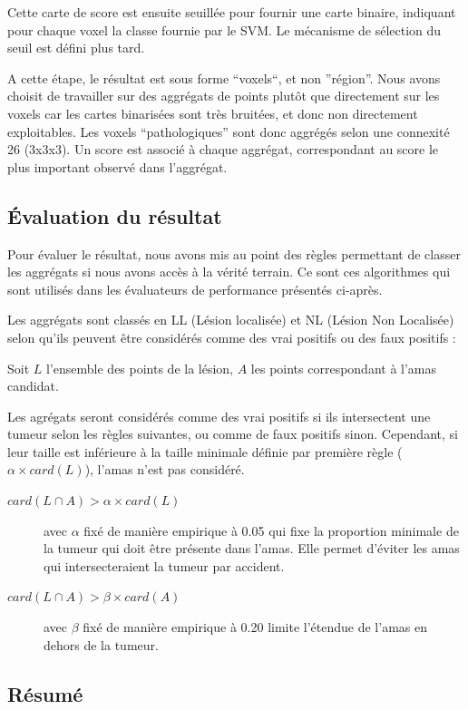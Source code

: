 Cette carte de score est ensuite seuillée pour fournir une carte binaire, indiquant pour chaque voxel la classe fournie par le SVM. Le mécanisme de sélection du seuil est défini plus tard. 

A cette étape, le résultat est sous forme ``voxels``, et non ''région''. Nous avons choisit de travailler sur des aggrégats de points plutôt que directement sur les voxels car les cartes binarisées sont très bruitées, et donc non directement exploitables. Les voxels ``pathologiques'' sont donc aggrégés selon une connexité 26 (3x3x3). Un score est associé à chaque  aggrégat, correspondant au score le plus important observé dans l'aggrégat.

\subsection{Évaluation du résultat}

Pour évaluer le résultat, nous avons mis au point des règles permettant de classer les aggrégats si nous avons accès à la vérité terrain. Ce sont ces algorithmes qui sont utilisés dans les évaluateurs de performance présentés ci-après.

Les aggrégats sont classés en LL (Lésion localisée) et NL (Lésion Non Localisée) selon qu'ils peuvent être considérés comme des vrai positifs ou des faux positifs :

Soit $L$ l'ensemble des points de la lésion, $A$ les points correspondant à l'amas candidat.

Les agrégats seront considérés comme des vrai positifs si ils intersectent une tumeur selon les règles suivantes, ou comme de faux positifs sinon. Cependant, si leur taille est inférieure à la taille minimale définie par première règle ($\alpha \times card( L )$), l'amas n'est pas considéré.

\begin{description}
 \item[$card( L \cap A ) > \alpha \times card( L )$] avec $\alpha$ fixé de manière empirique à 0.05 qui fixe la proportion minimale de la tumeur qui doit être présente dans l'amas. Elle permet d'éviter les amas qui intersecteraient la tumeur par accident.
 \item[$card( L \cap A ) > \beta \times card( A )$]  avec $\beta$ fixé de manière empirique à 0.20 limite l'étendue de l'amas en dehors de la tumeur.
\end{description}


\subsection{Résumé}

